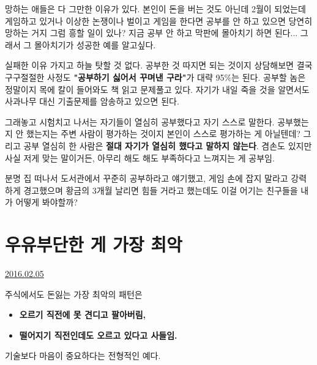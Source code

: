 망하는 애들은 다 그만한 이유가 있다.
본인이 돈을 버는 것도 아닌데
2월이 되었는데 게임하고 있거나 이상한 논쟁이나 벌이고 게임을 한다면 공부를 안 하고 있으면
당연히 망하는 거지 그럼 흥할 일이 있나?
지금 공부 안 하고 막판에 몰아치기 하면 된다... 그래서 그 몰아치기가 성공한 예를 알고싶다.
\vspace{5mm}

실패한 이유 가지고 하늘 탓할 것 없다. 공부한 것 따지면 되는 것이지
상담해보면 결국 구구절절한 사정도 \textbf{"공부하기 싫어서 꾸며낸 구라"}가 대략 95$\%$는 된다.
공부할 놈은 정말이지 목에 칼이 들어와도 책 읽고 문제풀고 있다.
자기가 내일 죽을 것을 알면서도 사과나무 대신 기출문제를 암송하고 있으면 된다.
\vspace{5mm}

그래놓고 시험치고 나서는 자기들이 열심히 공부했다고 자기 스스로 말한다.
공부했는지 안 했는지는 주변 사람이 평가하는 것이지 본인이 스스로 평가하는 게 아닐텐데?
그리고 공부 열심히 한 사람은 \textbf{절대 자기가 열심히 했다고 말하지 않는다}.
겸손도 있지만 사실 저게 맞는 말이거든, 아무리 해도 해도 부족하다고 느껴지는 게 공부임.
\vspace{5mm}

분명 집 떠나서 도서관에서 꾸준히 공부하라고 얘기했고, 게임 손에 잡지 말라고 강력하게 경고했으며
황금의 3개월 날리면 힘들 거라고 했는데도 이걸 어기는 친구들을 내가 어떻게 봐야할까?
\vspace{5mm}














\section{우유부단한 게 가장 최악}
\href{https://www.kockoc.com/Apoc/624579}{2016.02.05}

\vspace{5mm}

주식에서도 돈잃는 가장 최악의 패턴은
\vspace{5mm}
\begin{itemize}
    \item \textbf{오르기 직전에 못 견디고 팔아버림,}
    \item \textbf{떨어지기 직전인데도 오르고 있다고 사들임.}
\end{itemize}
\vspace{5mm}

기술보다 마음이 중요하다는 전형적인 예다.
\vspace{5mm}

